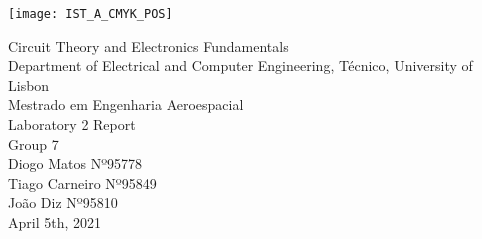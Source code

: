 
\thispagestyle {empty}

\texttt{[image: IST\_A\_CMYK\_POS]}

\begin{center}
%
\vspace{1.0cm}

\vspace{1cm}
{\FontLb Circuit Theory and Electronics Fundamentals} \\ %
\vspace{1cm}
{\FontSn Department of Electrical and Computer Engineering, Técnico, University of Lisbon} \\ %
{\FontSn Mestrado em Engenharia Aeroespacial} \\
\vspace{3cm}
{\FontSn Laboratory 2 Report} \\[1cm]
{\FontSn Group 7} \\[2cm]
{\FontSn Diogo Matos Nº95778} \\
{\FontSn Tiago Carneiro Nº95849} \\
{\FontSn João Diz Nº95810} \\
\vspace{10cm}
{\FontSn April 5th, 2021} \\ %
%
\end{center}

